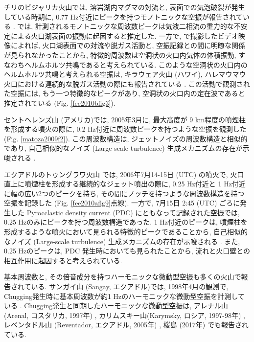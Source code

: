 \documentclass[12pt]{article}
\begin{document}
チリのビジャリカ火山では, 溶岩湖内マグマの対流と, 表面での気泡破裂が発生している時期に, 0.77 Hz付近にピークを持つモノトニックな空振が報告されている \citep{Ripepe2010b, Goto2011}. 
\cite{Ripepe2010b}では, 計測されるモノトニックな周波数ピークは気液二相流の重力的な不安定による火口湖表面の振動に起因すると推定した. %
一方で, \cite{Goto2011}で撮影したビデオ映像によれば, 火口湖表面での対流や脱ガス活動と, 空振記録との間に明瞭な関係が見られなかったことから, 特徴的周波数は空洞状の火口内気体の体積振動, すなわちヘルムホルツ共鳴であると考えられている. %
このような空洞状の火口内のヘルムホルツ共鳴と考えられる空振は, キラウェア火山 (ハワイ), ハレマウマウ火口における連続的な脱ガス活動の際にも報告されている \cite{Fee2010c}. 
この活動で観測された空振には, もう一つ特徴的なピークがあり, 空洞状の火口内の定在波であると推定されている (Fig. \ref{fee2010bfig3}). 

セントへレンズ山 (アメリカ)では, 2005年3月に, 最大高度が 9 km程度の噴煙柱を形成する噴火の際に, 0.2 Hz付近に周波数ピークを持つような空振を観測した (Fig. \ref{matoza2009f2}). 
この周波数構造は, ジェットノイズの周波数構造と相似的であり, 自己相似的なノイズ (Large-scale turbulence) 生成メカニズムの存在が示唆される \citep{Matoza2009a}.

エクアドルのトゥングラワ火山 \citep{Fee2010} では, 2006年7月14-15日 (UTC) の噴火で, 火口直上に噴煙柱を形成する継続的なジェット噴出の際に, 0.25 Hz付近と 1 Hz付近に幅の広い2つのピークを持ち, その間にノッチを持つような周波数構造を持つ空振を記録した (Fig. \ref{fee2010afig9}点線). 一方で, 7月15日 2:45 (UTC) ごろに発生した Pyrocclastic density current (PDC) にともなって記録された空振では, 0.25 Hzのみにピークを持つ周波数構造であった. 1 Hz付近のピークは, 噴煙柱を形成するような噴火において見られる特徴的ピークであることから, 自己相似的なノイズ (Large-scale turbulence) 生成メカニズムの存在が示唆される \citep{Matoza2009a}. また, 0.25 Hzのピークは, PDC 発生時においても見られたことから, 流れと火口壁との相互作用に起因すると考えられている.


基本周波数と, その倍音成分を持つハーモニックな微動型空振も多くの火山で報告されている. サンガイ山 (Sangay, エクアドル)では, 1998年4月の観測で, Chugging発生時に基本周波数が約1 Hzのハーモニックな微動型空振を計測している \citep{Johnson2000}. Chugging発生と同期したハーモニックな微動型空振は, アレナル山 (Arenal, コスタリカ, 1997年) \citep{Hagerty2000}, カリムスキー山(Karymsky, ロシア, 1997-98年) \citep{Johnson2000}, レベンタドル山 (Reventador, エクアドル, 2005年) \citep{Lees2008}, 桜島 (2017年) \citep{sakai1996, iguchi2018} でも報告されている.
\end{document}
